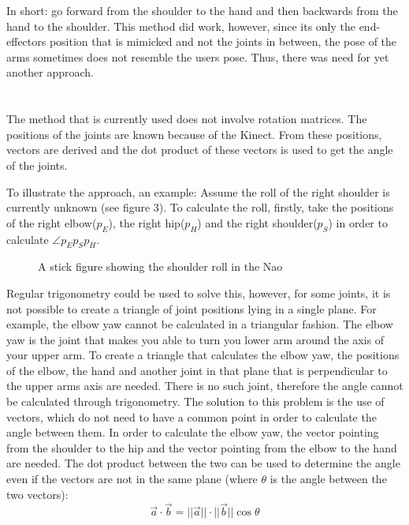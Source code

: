 \documentclass[letterpaper, 10pt, conference]{ieeeconf}
\begin{document}
In short: go forward from the shoulder to the hand and then backwards from the hand to the shoulder.
This method did work, however, since its only the end-effectors position that is mimicked and not the joints in between, the pose of the arms sometimes does not resemble the users pose. Thus, there was need for yet another approach.\\\\
\\
The method that is currently used does not involve rotation matrices. The positions of the joints are known because of the Kinect. From these positions, vectors are derived and the dot product of these vectors is used to get the angle of the joints. 

To illustrate the approach, an example: Assume the roll of the right shoulder is currently unknown (see figure 3). To calculate the roll, firstly, take the positions of the right elbow($p_{E}$), the right hip($p_{H}$) and the right shoulder($p_{S}$) in order to calculate $\angle p_{E}p_{S}p_{H}$.
\begin{figure}
\label{ShoulderRoll}
\caption{A stick figure showing the shoulder roll in the Nao}
\end{figure}
Regular trigonometry could be used to solve this, however, for some joints, it is not possible to create a triangle of joint positions lying in a single plane.  For example, the elbow yaw cannot be calculated in a triangular fashion. The elbow yaw is the joint that makes you able to turn you lower arm around the axis of your upper arm. To create a triangle that calculates the elbow yaw, the positions of the elbow, the hand and another joint in that plane that is perpendicular to the upper arms axis are needed. There is no such joint, therefore the angle cannot be calculated through trigonometry. The solution to this problem is the use of vectors, which do not need to have a common point in order to calculate the angle between them. In order to calculate the elbow yaw, the vector pointing from the shoulder to the hip and the vector pointing from the elbow to the hand are needed. The dot product between the two can be used to determine the angle even if the vectors are not in the same plane (where $\theta$ is the angle between the two vectors):
$$ \vec{a} \cdot \vec{b} = ||\vec{a}|| \cdot ||\vec{b}|| \cos{\theta}$$
\end{document}

